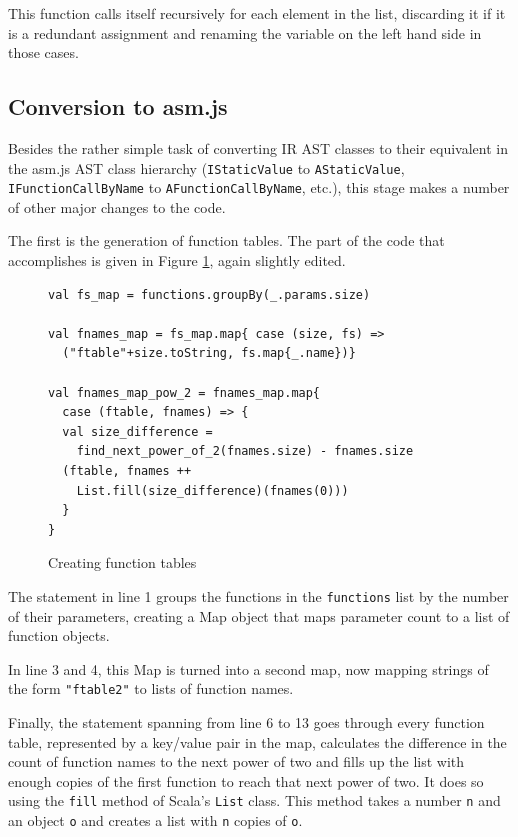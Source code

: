 \documentclass[11pt]{report}
\begin{document}
This function calls itself recursively for each element in the list, discarding it if it is a redundant assignment and renaming the variable on the left hand side in those cases.

\subsection{Conversion to asm.js}
Besides the rather simple task of converting IR AST classes to their equivalent in the asm.js AST class hierarchy (\texttt{IStaticValue} to \texttt{AStaticValue}, \texttt{IFunctionCallByName} to \texttt{AFunctionCallByName}, etc.), this stage makes a number of other major changes to the code.

The first is the generation of function tables. The part of the code that accomplishes is given in Figure \ref{iconvasmjs1}, again slightly edited.

\begin{figure}[ht]
\begin{lstlisting}
val fs_map = functions.groupBy(_.params.size)

val fnames_map = fs_map.map{ case (size, fs) => 
  ("ftable"+size.toString, fs.map{_.name})}
  
val fnames_map_pow_2 = fnames_map.map{ 
  case (ftable, fnames) => {
  val size_difference = 
    find_next_power_of_2(fnames.size) - fnames.size
  (ftable, fnames ++ 
    List.fill(size_difference)(fnames(0)))
  }
}
\end{lstlisting}
\caption{Creating function tables}
\label{iconvasmjs1}
\end{figure}

The statement in line 1 groups the functions in the \texttt{functions} list by the number of their parameters, creating a Map object that maps parameter count to a list of function objects.

In line 3 and 4, this Map is turned into a second map, now mapping strings of the form \texttt{"ftable2"} to lists of function names.

Finally, the statement spanning from line 6 to 13 goes through every function table, represented by a key/value pair in the map, calculates the difference in the count of function names to the next power of two and fills up the list with enough copies of the first function to reach that next power of two. It does so using the \texttt{fill} method of Scala's \texttt{List} class. This method takes a number \texttt{n} and an object \texttt{o} and creates a list with \texttt{n} copies of \texttt{o}.
\end{document}
